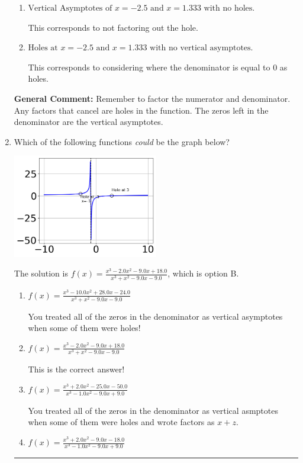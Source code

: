 \documentclass{extbook}[14pt]
\newcommand{\litem}[1]{\item #1

\rule{\textwidth}{0.4pt}}
\begin{document}
\begin{enumerate}
{\begin{enumerate}[label=\Alph*.]
This corresponds to mixing vertical and horizontal asymptotes.
\item \( \text{Vertical Asymptotes of } x = -2.5 \text{ and } x = 1.333 \text{ with no holes.} \)

This corresponds to not factoring out the hole.
\item \( \text{Holes at } x = -2.5 \text{ and } x = 1.333 \text{ with no vertical asymptotes.} \)

This corresponds to considering where the denominator is equal to 0 as holes.
\end{enumerate}

\textbf{General Comment:} Remember to factor the numerator and denominator. Any factors that cancel are holes in the function. The zeros left in the denominator are the vertical asymptotes.
}
\litem{
Which of the following functions \textit{could} be the graph below?

\begin{center}
    \includegraphics[width=0.5\textwidth]{../Figures/identifyGraphOfRationalFunctionCopyA.png}
\end{center}


The solution is \( f(x)=\frac{x^{3} -2.0 x^{2} -9.0 x + 18.0}{x^{3} + x^{2} -9.0 x -9.0} \), which is option B.\begin{enumerate}[label=\Alph*.]
\item \( f(x)=\frac{x^{3} -10.0 x^{2} +28.0 x -24.0}{x^{3} + x^{2} -9.0 x -9.0} \)

You treated all of the zeros in the denominator as vertical asymptotes when some of them were holes!
\item \( f(x)=\frac{x^{3} -2.0 x^{2} -9.0 x + 18.0}{x^{3} + x^{2} -9.0 x -9.0} \)

This is the correct answer!
\item \( f(x)=\frac{x^{3} +2.0 x^{2} -25.0 x -50.0}{x^{3} -1.0 x^{2} -9.0 x + 9.0} \)

You treated all of the zeros in the denominator as vertical asmptotes when some of them were holes and wrote factors as $x+z$.
\item \( f(x)=\frac{x^{3} +2.0 x^{2} -9.0 x -18.0}{x^{3} -1.0 x^{2} -9.0 x + 9.0} \)


\end{enumerate}}
\end{enumerate}
\end{document}
